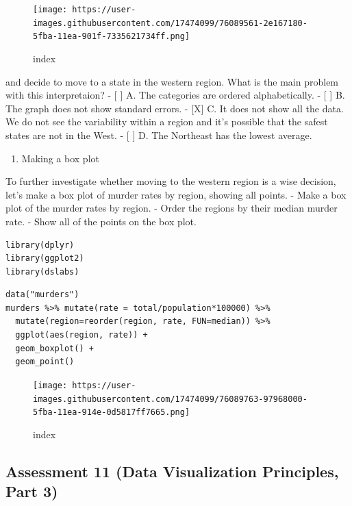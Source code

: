 \documentclass[
]{article}
\providecommand{\tightlist}{%
  \setlength{\itemsep}{0pt}\setlength{\parskip}{0pt}}
\begin{document}
\begin{figure}
\centering
\texttt{[image: https://user-images.githubusercontent.com/17474099/76089561-2e167180-5fba-11ea-901f-7335621734ff.png]}
\caption{index}
\end{figure}

and decide to move to a state in the western region. What is the main
problem with this interpretaion? - {[} {]} A. The categories are ordered
alphabetically. - {[} {]} B. The graph does not show standard errors. -
{[}X{]} C. It does not show all the data. We do not see the variability
within a region and it's possible that the safest states are not in the
West. - {[} {]} D. The Northeast has the lowest average.

\begin{enumerate}
\def\labelenumi{\arabic{enumi}.}
\setcounter{enumi}{3}
\tightlist
\item
  Making a box plot
\end{enumerate}

To further investigate whether moving to the western region is a wise
decision, let's make a box plot of murder rates by region, showing all
points. - Make a box plot of the murder rates by region. - Order the
regions by their median murder rate. - Show all of the points on the box
plot.

\begin{verbatim}
library(dplyr)
library(ggplot2)
library(dslabs)
\end{verbatim}

\begin{verbatim}
data("murders")
murders %>% mutate(rate = total/population*100000) %>%
  mutate(region=reorder(region, rate, FUN=median)) %>%
  ggplot(aes(region, rate)) +
  geom_boxplot() +
  geom_point()
\end{verbatim}

\begin{figure}
\centering
\texttt{[image: https://user-images.githubusercontent.com/17474099/76089763-97968000-5fba-11ea-914e-0d5817ff7665.png]}
\caption{index}
\end{figure}

\hypertarget{assessment-11-data-visualization-principles-part-3}{%
\subsection{Assessment 11 (Data Visualization Principles, Part
3)}\label{assessment-11-data-visualization-principles-part-3}}
\end{document}
